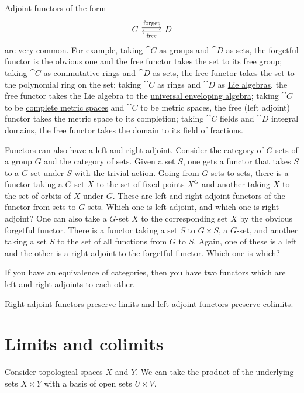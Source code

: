 \documentclass[11pt, twoside]{article}
\begin{document}
Adjoint functors of the form
\[
\begin{tikzcd}
\cat C \arrow[r, shift left, "\mathrm{forget}"]& \cat D\arrow[l, shift left, "\mathrm{free}"]
\end{tikzcd}
\]
are very common. For example, taking $\cat C$ as groups and $\cat D$ as sets, the forgetful functor is the obvious one and the free functor takes the set to its free group; taking $\cat C$ as commutative rings and $\cat D$ as sets, the free functor takes the set to the polynomial ring on the set; taking $\cat C$ as rings and $\cat D$ as \href{https://en.wikipedia.org/wiki/Lie_algebra}{\color{black}Lie algebras}, the free functor takes the Lie algebra to the \href{https://en.wikipedia.org/wiki/Universal_enveloping_algebra}{\color{black}universal enveloping algebra}; taking $\cat C$ to be \href{https://en.wikipedia.org/wiki/Complete_metric_space}{\color{black}complete metric spaces} and $\cat C$ to be metric spaces, the free (left adjoint) functor takes the metric space to its completion; taking $\cat C$ fields and $\cat D$ integral domains, the free functor takes the domain to its field of fractions.

Functors can also have a left and right adjoint. Consider the category of $G$-sets of a group $G$ and the category of sets. Given a set $S$, one gets a functor that takes $S$ to a $G$-set under $S$ with the trivial action. Going from $G$-sets to sets, there is a functor taking a $G$-set $X$ to the set of fixed points $X^G$ and another taking $X$ to the set of orbits of $X$ under $G$. These are left and right adjoint functors of the functor from sets to $G$-sets. Which one is left adjoint, and which one is right adjoint? One can also take a $G$-set $X$ to the corresponding set $X$ by the obvious forgetful functor. There is a functor taking a set $S$ to $G\times S$, a $G$-set, and another taking a set $S$ to the set of all functions from $G$ to $S$. Again, one of these is a left and the other is a right adjoint to the forgetful functor. Which one is which?

If you have an equivalence of categories, then you have two functors which are left and right adjoints to each other.

Right adjoint functors preserve \href{https://en.wikipedia.org/wiki/Limit_(category_theory)}{\color{black}limits} and left adjoint functors preserve \href{https://en.wikipedia.org/wiki/Limit_(category_theory)}{\color{black}colimits}.



\section{Limits and colimits}
Consider topological spaces $X$ and $Y$. We can take the product of the underlying sets $X\times Y$ with a basis of open sets $U\times V$.
\end{document}
